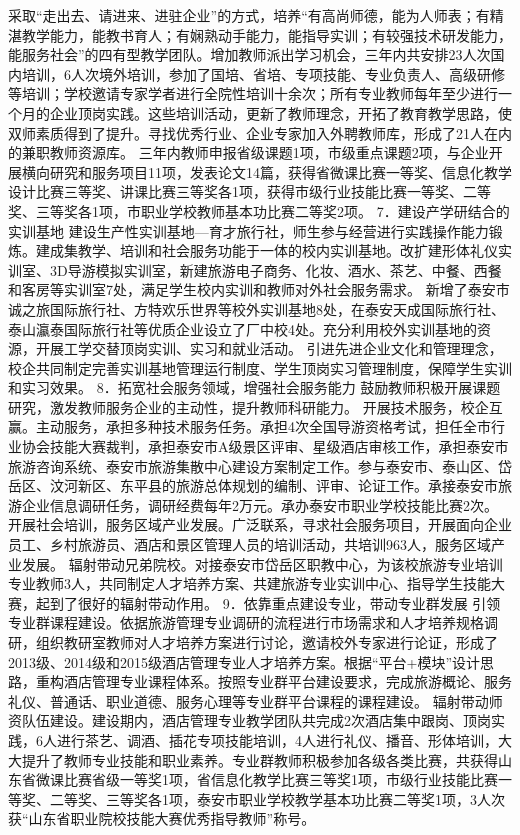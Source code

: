 采取“走出去、请进来、进驻企业”的方式，培养“有高尚师德，能为人师表；有精湛教学能力，能教书育人；有娴熟动手能力，能指导实训；有较强技术研发能力，能服务社会”的四有型教学团队。增加教师派出学习机会，三年内共安排23人次国内培训，6人次境外培训，参加了国培、省培、专项技能、专业负责人、高级研修等培训；学校邀请专家学者进行全院性培训十余次；所有专业教师每年至少进行一个月的企业顶岗实践。这些培训活动，更新了教师理念，开拓了教育教学思路，使双师素质得到了提升。寻找优秀行业、企业专家加入外聘教师库，形成了21人在内的兼职教师资源库。
三年内教师申报省级课题1项，市级重点课题2项，与企业开展横向研究和服务项目11项，发表论文14篇，获得省微课比赛一等奖、信息化教学设计比赛三等奖、讲课比赛三等奖各1项，获得市级行业技能比赛一等奖、二等奖、三等奖各1项，市职业学校教师基本功比赛二等奖2项。
7．建设产学研结合的实训基地
建设生产性实训基地—育才旅行社，师生参与经营进行实践操作能力锻炼。建成集教学、培训和社会服务功能于一体的校内实训基地。改扩建形体礼仪实训室、3D导游模拟实训室，新建旅游电子商务、化妆、酒水、茶艺、中餐、西餐和客房等实训室7处，满足学生校内实训和教师对外社会服务需求。
新增了泰安市诚之旅国际旅行社、方特欢乐世界等校外实训基地8处，在泰安天成国际旅行社、泰山瀛泰国际旅行社等优质企业设立了厂中校4处。充分利用校外实训基地的资源，开展工学交替顶岗实训、实习和就业活动。
引进先进企业文化和管理理念，校企共同制定完善实训基地管理运行制度、学生顶岗实习管理制度，保障学生实训和实习效果。
8．拓宽社会服务领域，增强社会服务能力
鼓励教师积极开展课题研究，激发教师服务企业的主动性，提升教师科研能力。
开展技术服务，校企互赢。主动服务，承担多种技术服务任务。承担4次全国导游资格考试，担任全市行业协会技能大赛裁判，承担泰安市A级景区评审、星级酒店审核工作，承担泰安市旅游咨询系统、泰安市旅游集散中心建设方案制定工作。参与泰安市、泰山区、岱岳区、汶河新区、东平县的旅游总体规划的编制、评审、论证工作。承接泰安市旅游企业信息调研任务，调研经费每年2万元。承办泰安市职业学校技能比赛2次。
开展社会培训，服务区域产业发展。广泛联系，寻求社会服务项目，开展面向企业员工、乡村旅游员、酒店和景区管理人员的培训活动，共培训963人，服务区域产业发展。
辐射带动兄弟院校。对接泰安市岱岳区职教中心，为该校旅游专业培训专业教师3人，共同制定人才培养方案、共建旅游专业实训中心、指导学生技能大赛，起到了很好的辐射带动作用。
9．依靠重点建设专业，带动专业群发展
引领专业群课程建设。依据旅游管理专业调研的流程进行市场需求和人才培养规格调研，组织教研室教师对人才培养方案进行讨论，邀请校外专家进行论证，形成了2013级、2014级和2015级酒店管理专业人才培养方案。根据“平台+模块”设计思路，重构酒店管理专业课程体系。按照专业群平台建设要求，完成旅游概论、服务礼仪、普通话、职业道德、服务心理等专业群平台课程的课程建设。
辐射带动师资队伍建设。建设期内，酒店管理专业教学团队共完成2次酒店集中跟岗、顶岗实践，6人进行茶艺、调酒、插花专项技能培训，4人进行礼仪、播音、形体培训，大大提升了教师专业技能和职业素养。专业群教师积极参加各级各类比赛，共获得山东省微课比赛省级一等奖1项，省信息化教学比赛三等奖1项，市级行业技能比赛一等奖、二等奖、三等奖各1项，泰安市职业学校教学基本功比赛二等奖1项，3人次获“山东省职业院校技能大赛优秀指导教师”称号。
